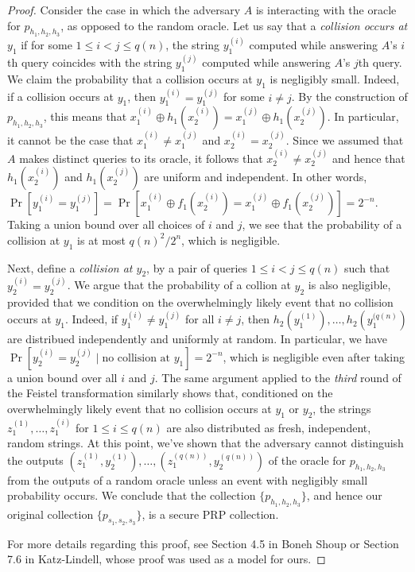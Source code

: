 \begin{proof}
Consider the case in which the adversary \(A\) is interacting with the
oracle for \(p_{h_1,h_2,h_3}\), as opposed to the random oracle. Let us
say that a \emph{collision occurs at \(y_1\)} if for some
\(1 \le i < j \le q(n)\), the string \(y_1^{(i)}\) computed while
answering \(A\)'s \(i\)th query coincides with the string \(y_1^{(j)}\)
computed while answering \(A\)'s \(j\)th query. We claim the probability
that a collision occurs at \(y_1\) is negligibly small. Indeed, if a
collision occurs at \(y_1\), then \(y_1^{(i)} = y_1^{(j)}\) for some
\(i \neq j\). By the construction of \(p_{h_1,h_2,h_3}\), this means
that
\(x_1^{(i)} \oplus h_1(x_2^{(i)}) = x_1^{(j)} \oplus h_1(x_2^{(j)})\).
In particular, it cannot be the case that \(x_1^{(i)} \neq x_1^{(j)}\)
and \(x_2^{(i)} = x_2^{(j)}\). Since we assumed that \(A\) makes
distinct queries to its oracle, it follows that
\(x_2^{(i)} \neq x_2^{(j)}\) and hence that \(h_1(x_2^{(i)})\) and
\(h_1(x_2^{(j)})\) are uniform and independent. In other words,
\(\Pr[y_1^{(i)} = y_1^{(j)}] = \Pr[x_1^{(i)} \oplus f_1(x_2^{(i)}) = x_1^{(j)} \oplus f_1(x_2^{(j)})] = 2^{-n}\).
Taking a union bound over all choices of \(i\) and \(j\), we see that
the probability of a collision at \(y_1\) is at most \(q(n)^2/2^n\),
which is negligible.

Next, define a \emph{collision at \(y_2\)}, by a pair of queries
\(1 \le i < j \le q(n)\) such that \(y_2^{(i)} = y_2^{(j)}\). We argue
that the probability of a collion at \(y_2\) is also negligible,
provided that we condition on the overwhelmingly likely event that no
collision occurs at \(y_1\). Indeed, if \(y_1^{(i)} \neq y_1^{(j)}\) for
all \(i \neq j\), then \(h_2(y_1^{(1)}), \ldots, h_2(y_1^{(q(n)})\) are
distribued independently and uniformly at random. In particular, we have
\(\Pr[y_2^{(i)} = y_2^{(j)} \mid \text{no collision at }y_1] = 2^{-n}\),
which is negligible even after taking a union bound over all \(i\) and
\(j\). The same argument applied to the \emph{third} round of the
Feistel transformation similarly shows that, conditioned on the
overwhelmingly likely event that no collision occurs at \(y_1\) or
\(y_2\), the strings \(z_1^{(1)}, \ldots, z_1^{(i)}\) for
\(1 \le i \le q(n)\) are also distributed as fresh, independent, random
strings. At this point, we've shown that the adversary cannot
distinguish the outputs
\((z_1^{(1)}, y_2^{(1)}), \ldots, (z_1^{(q(n))}, y_2^{(q(n))})\) of the
oracle for \(p_{h_1,h_2,h_3}\) from the outputs of a random oracle
unless an event with negligibly small probability occurs. We conclude
that the collection \(\{p_{h_1,h_2,h_3}\}\), and hence our original
collection \(\{p_{s_1,s_2,s_3}\}\), is a secure PRP collection.

For more details regarding this proof, see Section 4.5 in Boneh Shoup or
Section 7.6 in Katz-Lindell, whose proof was used as a model for ours.

\end{proof}

